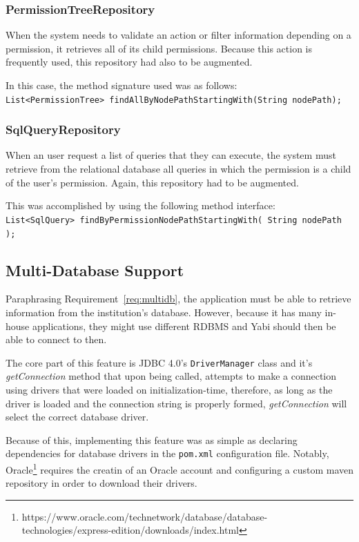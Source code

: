 \subsubsection{PermissionTreeRepository}
When the system needs to validate an action or filter information depending on a permission, it retrieves all of its child permissions. Because this action is frequently used, this repository had also to be augmented.

In this case, the method signature used was as follows:\\
\texttt{List<PermissionTree> findAllByNodePathStartingWith(String~nodePath);}

\subsubsection{SqlQueryRepository}
When an user request a list of queries that they can execute, the system must retrieve from the relational database all queries in which the permission is a child of the user's permission. Again, this repository had to be augmented.

This was accomplished by using the following method interface:\\
\texttt{List<SqlQuery> findByPermissionNodePathStartingWith( String~nodePath );}

\subsection{Multi-Database Support}
Paraphrasing Requirement~\ref{req:multidb}, the application must be able to retrieve information from the institution's database. However, because it has many in-house applications, they might use different \gls{RDBMS} and \gls{Yabi} should then be able to connect to then.

The core part of this feature is \gls{JDBC} 4.0's \texttt{DriverManager} class and it's \textit{getConnection} method that upon being called, attempts to make a connection using drivers that were loaded on initialization-time, therefore, as long as the driver is loaded and the connection string is properly formed, \textit{getConnection} will select the correct database driver.

Because of this, implementing this feature was as simple as declaring dependencies for database drivers in the \texttt{pom.xml} configuration file. Notably, Oracle\footnote{https://www.oracle.com/technetwork/database/database-technologies/express-edition/downloads/index.html} requires the creatin of an Oracle account and configuring a custom maven repository in order to download their drivers.

